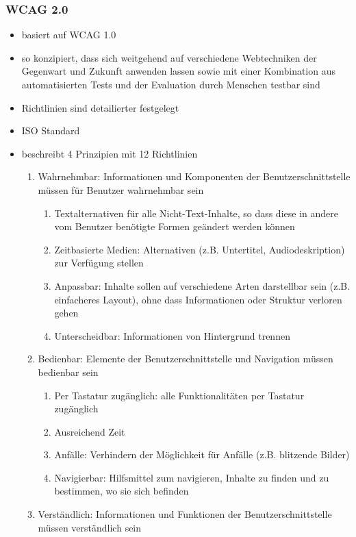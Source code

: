 \documentclass[paper=a4, fontsize=11pt]{scrartcl} %
\numberwithin{equation}{section} %
\numberwithin{figure}{section} %
\numberwithin{table}{section} %
\begin{document}
\subsubsection{WCAG 2.0}

\begin{itemize}
\item basiert auf WCAG 1.0
\item so konzipiert, dass sich weitgehend auf verschiedene Webtechniken der Gegenwart und Zukunft anwenden lassen sowie mit einer Kombination aus automatisierten Tests und der Evaluation durch Menschen testbar sind
\item Richtlinien sind detailierter festgelegt
\item ISO Standard
\item beschreibt 4 Prinzipien mit 12 Richtlinien
\begin{enumerate}[label*=\arabic*.]
\item Wahrnehmbar: Informationen und Komponenten der Benutzerschnittstelle müssen für Benutzer wahrnehmbar sein
\begin{enumerate}[label*=\arabic*.]
\item Textalternativen für alle Nicht-Text-Inhalte, so dass diese in andere vom Benutzer benötigte Formen geändert werden können
\item Zeitbasierte Medien: Alternativen (z.B. Untertitel, Audiodeskription) zur Verfügung stellen
\item Anpassbar: Inhalte sollen auf verschiedene Arten darstellbar sein (z.B. einfacheres Layout), ohne dass Informationen oder Struktur verloren gehen
\item Unterscheidbar: Informationen von Hintergrund trennen
\end{enumerate}
\item Bedienbar: Elemente der Benutzerschnittstelle und Navigation müssen bedienbar sein
\begin{enumerate}[label*=\arabic*.]
\item Per Tastatur zugänglich: alle Funktionalitäten per Tastatur zugänglich
\item Ausreichend Zeit
\item Anfälle: Verhindern der Möglichkeit für Anfälle (z.B. blitzende Bilder)
\item Navigierbar: Hilfsmittel zum navigieren, Inhalte zu finden und zu bestimmen, wo sie sich befinden
\end{enumerate}
\item Verständlich: Informationen und Funktionen der Benutzerschnittstelle müssen verständlich sein

\end{enumerate}
\end{itemize}
\end{document}
